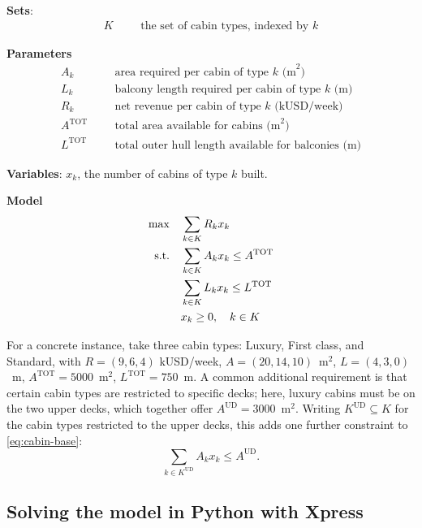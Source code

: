 \medskip
\noindent\textbf{Sets}: 
\begin{align*}
    K & && \text{the set of cabin types, indexed by } k
\end{align*}

\medskip
\noindent\textbf{Parameters}
\begin{align*}
  A_k & && \text{area required per cabin of type } k \text{ (m}^2\text{)} \\
  L_k & && \text{balcony length required per cabin of type } k \text{ (m)} \\
  R_k & && \text{net revenue per cabin of type } k \text{ (kUSD/week)} \\
  A^{\text{TOT}} & && \text{total area available for cabins (m}^2\text{)} \\
  L^{\text{TOT}} & && \text{total outer hull length available for balconies (m)}
\end{align*}

\noindent\textbf{Variables}: $x_k$, the number of cabins of type $k$ built.

\medskip
\noindent\textbf{Model}
\begin{align}
  \max \quad & \sum_{k \in K} R_k x_k \label{eq:cabin-base}\\
  \text{s.t.} \quad & \sum_{k \in K} A_k x_k \leq A^{\text{TOT}} \notag\\
  & \sum_{k \in K} L_k x_k \leq L^{\text{TOT}} \notag\\
  & x_k \geq 0, \quad k \in K \notag
\end{align}

For a concrete instance, take three cabin types: Luxury, First class, and
Standard, with $R = (9,6,4)$ kUSD/week, $A = (20,14,10)$~m$^2$,
$L = (4,3,0)$~m, $A^{\text{TOT}} = 5000$~m$^2$, $L^{\text{TOT}} = 750$~m.
A common additional requirement is that certain cabin types are restricted
to specific decks; here, luxury cabins must be on the two upper decks,
which together offer $A^{\text{UD}} = 3000$~m$^2$. Writing $K^{\text{UD}}
\subseteq K$ for the cabin types restricted to the upper decks, this adds
one further constraint to \eqref{eq:cabin-base}:
\begin{equation}
  \sum_{k \in K^{\text{UD}}} A_k x_k \leq A^{\text{UD}}. \label{eq:cabin-ud}
\end{equation}

\subsection{Solving the model in Python with Xpress}

